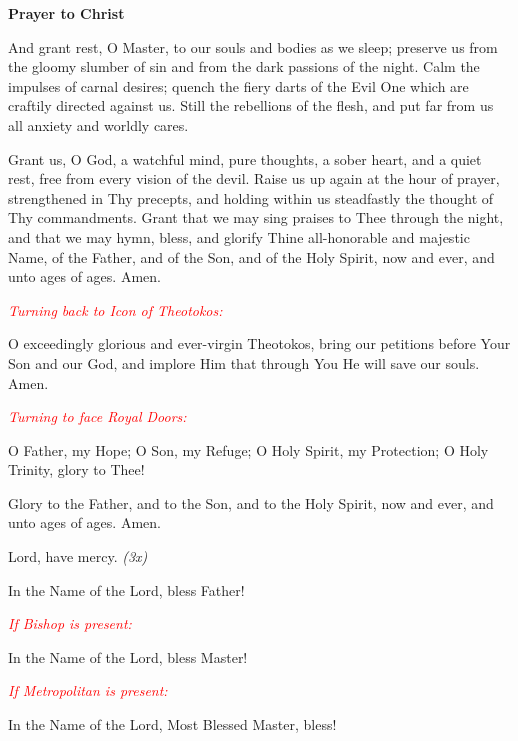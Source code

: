 \documentclass[paper=a6,fontsize=2.3mm]{scrartcl}
\begin{document}
\newpage
\begin{center}
\textbf{Prayer to Christ}
\end{center}

\noindent\makebox[10mm][l]{}
\begin{minipage}[t]{\dimexpr \textwidth-10mm}And grant rest, O Master, to our 
souls and bodies as we sleep; preserve us from the gloomy slumber of sin and 
from the dark passions of the night. Calm the impulses of carnal desires; 
quench the fiery darts of the Evil One which are craftily directed against us.  
Still the rebellions of the flesh, and put far from us all anxiety and worldly 
cares.

Grant us, O God, a watchful mind, pure thoughts, a sober heart, and a quiet rest, free from every vision of the devil.  Raise us up again at the hour of prayer, strengthened in Thy precepts, and holding within us steadfastly the thought of Thy commandments.  Grant that we may sing praises to Thee through the night, and that we may hymn, bless, and glorify Thine all-honorable and majestic Name, of the Father, and of the Son, and of the Holy Spirit, now and ever, and unto ages of ages.  Amen.
\end{minipage}

\textcolor{red}{\textit{Turning back to Icon of Theotokos:}}

\hangindent=10mm
\noindent\makebox[10mm][l]{}O exceedingly glorious and ever-virgin Theotokos, 
bring our petitions before Your Son and our God, and implore Him that through 
You He will save our souls.  Amen.

\textcolor{red}{\textit{Turning to face Royal Doors:}}

\hangindent=10mm
\noindent\makebox[10mm][l]{}O Father, my Hope;  O Son, my Refuge;  O Holy 
Spirit, my Protection;  O Holy Trinity, glory to Thee!

\noindent{}
\begin{minipage}[t]{\dimexpr \textwidth-10mm}Glory to the Father, and to the 
Son, and to the Holy Spirit, now and ever, and unto ages of ages.  Amen.

Lord, have mercy. \textit{(3x)}

In the Name of the Lord, bless Father!

\textcolor{red}{\textit{If Bishop is present:}}

In the Name of the Lord, bless Master!

\textcolor{red}{\textit{If Metropolitan is present:}}

In the Name of the Lord, Most Blessed Master, bless!
\end{minipage}
\end{document}
